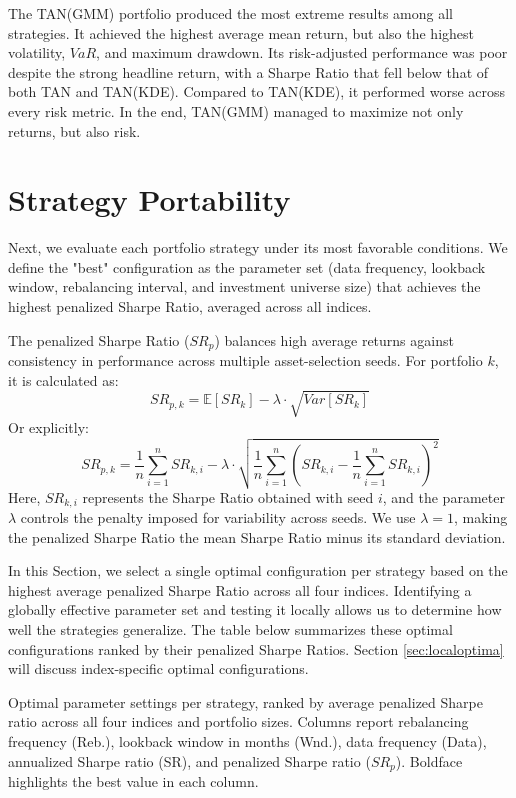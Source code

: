 The TAN(GMM) portfolio produced the most extreme results among all strategies. It achieved the highest average mean return, but also the highest volatility, $VaR$, and maximum drawdown. Its risk-adjusted performance was poor despite the strong headline return, with a Sharpe Ratio that fell below that of both TAN and TAN(KDE). Compared to TAN(KDE), it performed worse across every risk metric. In the end, TAN(GMM) managed to maximize not only returns, but also risk.


\section{Strategy Portability}
\label{sec:portability}

Next, we evaluate each portfolio strategy under its most favorable conditions. We define the "best" configuration as the parameter set (data frequency, lookback window, rebalancing interval, and investment universe size) that achieves the highest penalized Sharpe Ratio, averaged across all indices.

The penalized Sharpe Ratio ($SR_p$) balances high average returns against consistency in performance across multiple asset-selection seeds. For portfolio $k$, it is calculated as:
$$SR_{p,k} = \mathbb{E}[SR_k] - \lambda \cdot \sqrt{Var[SR_k]}$$
Or explicitly:
$$SR_{p,k} = \frac{1}{n} \sum_{i=1}^{n} SR_{k,i} - \lambda \cdot \sqrt{ \frac{1}{n} \sum_{i=1}^{n} \left( SR_{k,i} - \frac{1}{n} \sum_{i=1}^{n} SR_{k,i} \right)^2 }$$
Here, $SR_{k,i}$ represents the Sharpe Ratio obtained with seed $i$, and the parameter $\lambda$ controls the penalty imposed for variability across seeds. We use $\lambda=1$, making the penalized Sharpe Ratio the mean Sharpe Ratio minus its standard deviation.

In this Section, we select a single optimal configuration per strategy based on the highest average penalized Sharpe Ratio across all four indices. Identifying a globally effective parameter set and testing it locally allows us to determine how well the strategies generalize. The table below summarizes these optimal configurations ranked by their penalized Sharpe Ratios. Section \ref{sec:localoptima} will discuss index-specific optimal configurations.

\begin{table}[H]
  \centering
  
  \caption[Best configurations - Global]{Optimal parameter settings per strategy, ranked by average penalized Sharpe ratio across all four indices and portfolio sizes. Columns report rebalancing frequency (Reb.), lookback window in months (Wnd.), data frequency (Data), annualized Sharpe ratio (SR), and penalized Sharpe ratio ($SR_p$). Boldface highlights the best value in each column.}
  \label{tab:single4}
\end{table}

